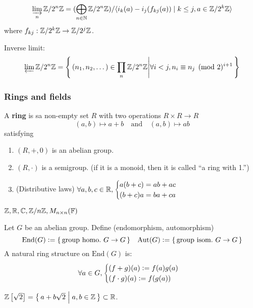 \[ \varinjlim\limits_n {\mathbb{Z}}/{2^n\mathbb{Z}} =
  {(\bigoplus_{n\in\mathbb{N}} {\mathbb{Z}}/{2^n\mathbb{Z}})}/{
  \langle i_k(a) - i_j(f_{kj}(a)) \mid k \le j, a \in {\mathbb{Z}}/{2^k\mathbb{Z}} \rangle}
\]
where $f_{kj}: {\mathbb{Z}}/{2^k\mathbb{Z}} \to {\mathbb{Z}}/{2^j\mathbb{Z}}$.

Inverse limit:
\[
  \varprojlim {\mathbb{Z}}/{2^n\mathbb{Z}} = \left\{\,
    (n_1, n_2, \dots ) \in \prod_n {\mathbb{Z}}/{2^n\mathbb{Z}} \middle|
    \forall i < j, n_i \equiv n_j \pmod 2^{i+1}   \,\right\}
\]

\subsubsection{Rings and fields}

\begin{definition}
  A {\bf ring} is sa non-empty set $R$ with two operations $R\times R \to R$
  \[
    (a, b) \mapsto a + b \quad \text{and} \quad (a, b) \mapsto ab
  \]
  satisfying
  \begin{enumerate}
    \item $(R, +, 0)$ is an abelian group.
    \item $(R, \cdot)$ is a semigroup. (if it is a monoid, then it is called
      ``a ring with 1.'')
    \item (Distributive laws) $\forall a, b, c \in \mathbb{R}, \begin{cases}
      a(b + c) = ab + ac\\ (b + c)a = ba + ca\end{cases}$
  \end{enumerate}
\end{definition}

\begin{example}
  $\mathbb{Z}, \mathbb{R}, \mathbb{C}, {\mathbb{Z}}/{n\mathbb{Z}}, M_{n\times n}(\mathbb{F})$
\end{example}

\begin{example}
  Let $G$ be an abelian group.
  Define (endomorphism, automorphism)
  \[
    \text{End}(G) \vcentcolon= \{\, \text{group homo.~} G \to G \,\} \quad
    \text{Aut}(G) \vcentcolon= \{\, \text{group isom.~} G \to G \,\}
  \]
  A natural ring structure on $\text{End}(G)$ is:
  \[
    \forall a \in G, \begin{cases}
      (f+g)(a) \vcentcolon= f(a)g(a) \\
      (f\cdot g)(a) \vcentcolon= f(g(a))
    \end{cases}
  \]
\end{example}

\begin{example}
  $\mathbb{Z}\left[\sqrt{2}\right] = \left\{\,
  a + b\sqrt{2} \mathrel{}\middle|\mathrel{} a, b \in \mathbb{Z} \,\right\} \subset \mathbb{R}$.
\end{example}

